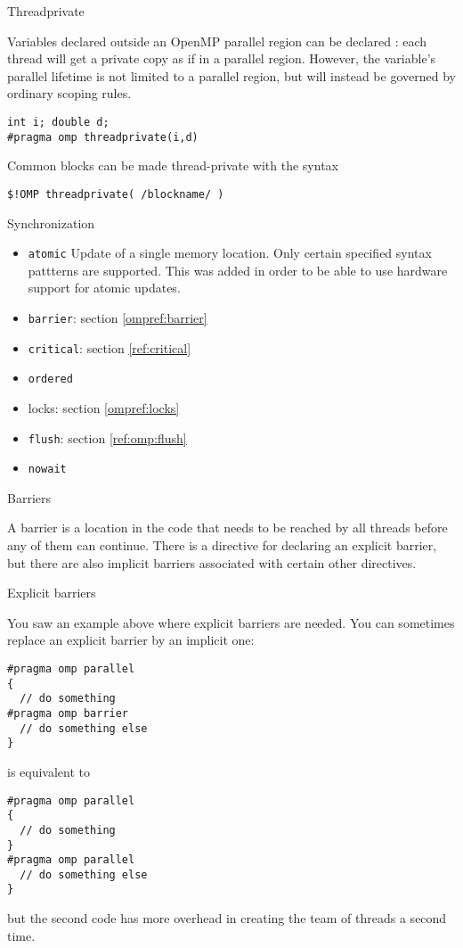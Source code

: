  {Threadprivate}

Variables declared outside an OpenMP parallel region can be declared
: each thread will get a private copy
as if in a parallel region. However, the variable's parallel lifetime is not limited
to a parallel region, but will instead be governed by ordinary scoping rules.
\begin{verbatim}
int i; double d;
#pragma omp threadprivate(i,d)
\end{verbatim}

\begin{fortrannote}
  Common blocks can be made thread-private with the syntax
\begin{verbatim}
$!OMP threadprivate( /blockname/ )
\end{verbatim}
\end{fortrannote}

 {Synchronization}

\begin{itemize}
\item \texttt{atomic} Update of a single memory location. Only certain
  specified syntax pattterns are supported. This was added in order to
  be able to use hardware support for atomic updates.
\item \texttt{barrier}: section \ref{ompref:barrier}
\item \texttt{critical}: section \ref{ref:critical}
\item \texttt{ordered}
\item locks: section \ref{ompref:locks}
\item \texttt{flush}: section \ref{ref:omp:flush}
\item \texttt{nowait}
\end{itemize}

 {Barriers}
\label{ompref:barrier}

A barrier is a location in the code that needs to be reached
by all threads before any of them can continue. There is 
a directive for declaring an explicit barrier, but 
there are also implicit barriers associated with certain other 
directives.

 {Explicit barriers}

You saw an example above where explicit barriers are needed.
You can sometimes replace an explicit barrier by an implicit one:
\begin{verbatim}
#pragma omp parallel
{
  // do something
#pragma omp barrier
  // do something else
}
\end{verbatim}
is equivalent to
\begin{verbatim}
#pragma omp parallel
{
  // do something
}
#pragma omp parallel
  // do something else
}
\end{verbatim}
but the second code has more overhead in creating the team of threads a second time.

